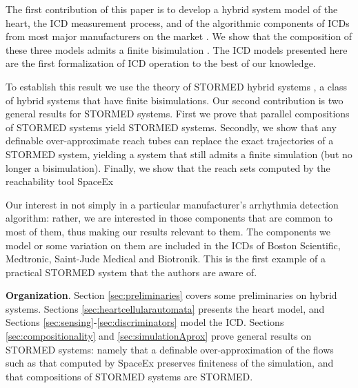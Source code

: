 The first contribution of this paper is to develop a hybrid system model of the heart, the \ac{ICD} measurement process, and of the algorithmic components of \acp{ICD} from most major manufacturers on the market .
We show that the composition of these three models admits a finite bisimulation \cite{AlurHLP00ieee}.
The \ac{ICD} models presented here are the first formalization of \ac{ICD} operation to the best of our knowledge.

To establish this result we use the theory of STORMED hybrid systems \cite{VladimerouPVD08_STORMED}, a class of hybrid systems that have finite bisimulations.
Our second contribution is two general results for STORMED systems.
First we prove that parallel compositions of STORMED systems yield STORMED systems.
Secondly, we show that any definable over-approximate reach tubes can replace the exact trajectories of a STORMED system, yielding a system that still admits a finite simulation (but no longer a bisimulation). 
Finally, we show that the reach sets computed by the reachability tool SpaceEx \cite{FrehseCAV11} 


Our interest in not simply in a particular manufacturer's arrhythmia detection algorithm: rather, we are interested in those components that are common to most of them, thus making our results relevant to them.
The components we model or some variation on them are included in the \acp{ICD} of Boston Scientific, Medtronic, Saint-Jude Medical and Biotronik.
This is the first example of a practical STORMED system that the authors are aware of.

\textbf{Organization}. 
Section \ref{sec:preliminaries} covers some preliminaries on hybrid systems.
Sections \ref{sec:heartcellularautomata} presents the heart model,
and Sections \ref{sec:sensing}-\ref{sec:discriminators} model the \ac{ICD}.
Sections \ref{sec:compositionality} and \ref{sec:simulationAprox} prove general results on STORMED systems: namely that a definable over-approximation of the flows such as that computed by SpaceEx preserves finiteness of the simulation, and that compositions of STORMED systems are STORMED.

